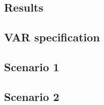         \subsection{Results}
            \lipsum[1]
            \subsection{VAR specification}
                \lipsum[1]
            \subsection{Scenario 1}
                \lipsum[1]
                    \lipsum[1]
            \subsection{Scenario 2}
                \lipsum[1]
                    \lipsum[1]